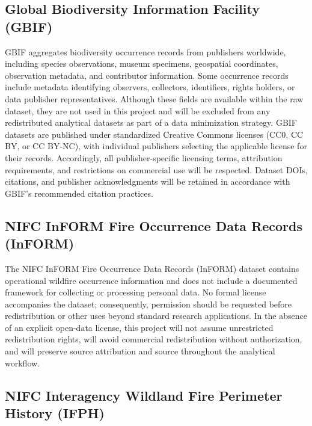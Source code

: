 \documentclass[
  letterpaper,
  DIV=11,
  numbers=noendperiod]{scrartcl}
\begin{document}
\subsection{Global Biodiversity Information Facility
(GBIF)}\label{global-biodiversity-information-facility-gbif}

GBIF aggregates biodiversity occurrence records from publishers
worldwide, including species observations, museum specimens, geospatial
coordinates, observation metadata, and contributor information. Some
occurrence records include metadata identifying observers, collectors,
identifiers, rights holders, or data publisher representatives. Although
these fields are available within the raw dataset, they are not used in
this project and will be excluded from any redistributed analytical
datasets as part of a data minimization strategy. GBIF datasets are
published under standardized Creative Commons licenses (CC0, CC BY, or
CC BY-NC), with individual publishers selecting the applicable license
for their records. Accordingly, all publisher-specific licensing terms,
attribution requirements, and restrictions on commercial use will be
respected. Dataset DOIs, citations, and publisher acknowledgments will
be retained in accordance with GBIF's recommended citation practices.

\subsection{NIFC InFORM Fire Occurrence Data Records
(InFORM)}\label{nifc-inform-fire-occurrence-data-records-inform}

The NIFC InFORM Fire Occurrence Data Records (InFORM) dataset contains
operational wildfire occurrence information and does not include a
documented framework for collecting or processing personal data. No
formal license accompanies the dataset; consequently, permission should
be requested before redistribution or other uses beyond standard
research applications. In the absence of an explicit open-data license,
this project will not assume unrestricted redistribution rights, will
avoid commercial redistribution without authorization, and will preserve
source attribution and source throughout the analytical workflow.

\subsection{NIFC Interagency Wildland Fire Perimeter History
(IFPH)}\label{nifc-interagency-wildland-fire-perimeter-history-ifph}
\end{document}
